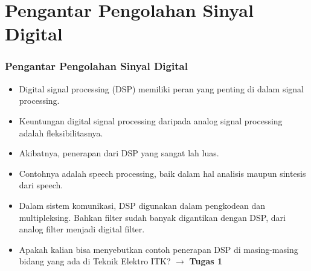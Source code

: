 \documentclass[pdflatex,compress]{beamer}
\begin{document}
\section{Pengantar Pengolahan Sinyal Digital}

\begin{frame}
	\frametitle{Pengantar Pengolahan Sinyal Digital}
	\begin{itemize}
		\item Digital signal processing (DSP) memiliki peran yang penting di dalam signal processing.
		\item Keuntungan digital signal processing daripada analog signal processing adalah fleksibilitasnya.
		\item Akibatnya, penerapan dari DSP yang sangat lah luas.
		\item Contohnya adalah speech processing, baik dalam hal analisis maupun sintesis dari speech.
		\item Dalam sistem komunikasi, DSP digunakan dalam pengkodean dan multipleksing. Bahkan filter sudah banyak digantikan dengan DSP, dari analog filter menjadi digital filter.
		\item Apakah kalian bisa menyebutkan contoh penerapan DSP di masing-masing bidang yang ada di Teknik Elektro ITK? $\rightarrow$ \textbf{Tugas 1}
	\end{itemize}
\end{frame}
\end{document}
